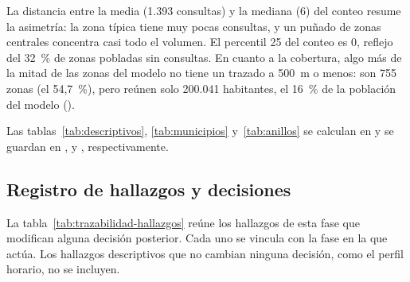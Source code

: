 La distancia entre la media (1.393 consultas) y la mediana (6) del conteo resume la
asimetría: la zona típica tiene muy pocas consultas, y un puñado de zonas centrales
concentra casi todo el volumen. El percentil 25 del conteo es 0, reflejo del 32~\% de
zonas pobladas sin consultas. En cuanto a la cobertura, algo más de la mitad de las zonas
del modelo no tiene un trazado a 500~m o menos: son 755 zonas (el 54,7~\%), pero reúnen
solo 200.041 habitantes, el 16~\% de la población del modelo
().

Las tablas~\ref{tab:descriptivos}, \ref{tab:municipios} y~\ref{tab:anillos} se calculan en
 y se guardan en
,
 y , respectivamente.

\subsection{Registro de hallazgos y decisiones}
\label{sec:hallazgos-decisiones}

La tabla~\ref{tab:trazabilidad-hallazgos} reúne los hallazgos de esta fase que modifican
alguna decisión posterior. Cada uno se vincula con la fase en la que actúa. Los hallazgos
descriptivos que no cambian ninguna decisión, como el perfil horario, no se incluyen.

